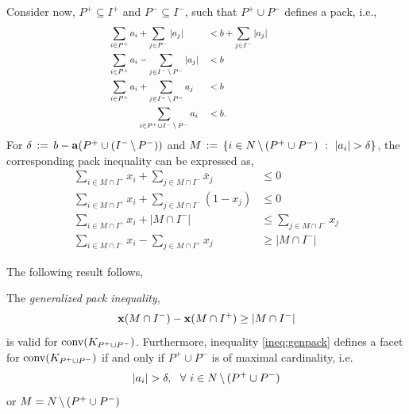 \documentclass[10pt,twoside]{amsart}
\begin{document}
Consider now, $P^+ \subseteq I^+$ and $P^- \subseteq I^-$, such that $P^+ \cup P^-$ defines a pack, i.e.,
\begin{align*}
  \hspace*{4cm}\sum_{i\in P^+} a_i &+ \sum_{j\in P^-} |a_j| & & < b + \sum_{j\in I^-} |a_j| &\hspace*{5cm}\\
  \hspace*{4cm}\sum_{i\in P^+} a_i &- \sum_{j\in I^-\sm P^-} |a_j| & & < b &\hspace*{5cm}\\
  \hspace*{4cm}\sum_{i\in P^+} a_i &+ \sum_{j\in I^-\sm P^-} a_j & & < b &\hspace*{5cm}\\
  \hspace*{4cm}&\sum_{i\in P^+\cup I^-\sm P^-} a_i & & < b. &\hspace*{5cm}\\
\end{align*}
For $\delta \,:=\, b - \mathbf{a}(P^+\cup (I^-\,\backslash\, P^-))$  and  $M \,:=\, \left\{ {i\in N\,\backslash\, (P^+\cup P^-)} \ : \ {|a_i| > \delta} \right\}$, the corresponding pack inequality can be expressed as,
\begin{align*}
    \sum_{i\in M\cap I^+} x_i + \sum_{j\in M\cap I^-} \bar{x}_j & \leq 0\\
    \sum_{i\in M\cap I^+} x_i + \sum_{j\in M\cap I^-} (1 - {x}_j) & \leq 0\\
    \sum_{i\in M\cap I^+} x_i + |M\cap I^-| & \leq \sum_{j\in M\cap I^-} x_j\\
    \sum_{i\in M\cap I^-} x_i - \sum_{j\in M\cap I^+} x_j  & \geq |M\cap I^-|
\end{align*}

The following result follows,
\begin{prop}
  The \emph{generalized pack inequality},
    \begin{align}
    \label{ineq:genpack}
      \mathbf{x}(M\cap I^-) - \mathbf{x}(M\cap I^+) \geq |M\cap I^-|
    \end{align}
  is valid for $\operatorname{conv}(K_{P^+ \cup P^-})$. Furthermore, inequality \eqref{ineq:genpack} defines a facet for $\operatorname{conv}(K_{P^+ \cup P^-})$ if and only if $P^+\cup P^-$ is of maximal cardinality, i.e.
  \begin{align*}
    |a_i| > \delta,\,\,\,\, \forall\,\, i \in N\,\backslash\, (P^+\cup P^-)
  \end{align*}
  or $M = N\,\backslash\, (P^+\cup P^-)$
\end{prop}
\end{document}
